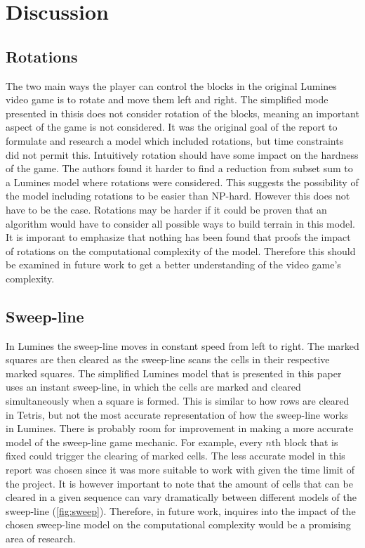 \section{Discussion}
\label{discussion}

\subsection{Rotations}

The two main ways the player can control the blocks in the original Lumines video game is to rotate and move them left and right. The simplified mode presented in thisis does not consider rotation of the blocks, meaning an important aspect of the game is not considered. It was the original goal of the report to formulate and research a model which included rotations, but time constraints did not permit this. Intuitively rotation should have some impact on the hardness of the game. The authors found it harder to find a reduction from subset sum to a Lumines model where rotations were considered. This suggests the possibility of the model including rotations to be easier than NP-hard. However this does not have to be the case. Rotations may be harder if it could be proven that an algorithm would have to consider all possible ways to build terrain in this model. It is imporant to emphasize that nothing has been found that proofs the impact of rotations on the computational complexity of the model. Therefore this should be examined in future work to get a better understanding of the video game's complexity.

\subsection{Sweep-line}

In Lumines the sweep-line moves in constant speed from left to right. The marked squares are then cleared as the sweep-line scans the cells in their respective marked squares. The simplified Lumines model that is presented in this paper uses an instant sweep-line, in which the cells are marked and cleared simultaneously when a square is formed. This is similar to how rows are cleared in Tetris, but not the most accurate representation of how the sweep-line works in Lumines. There is probably room for improvement in making a more accurate model of the sweep-line game mechanic. For example, every $n\text{th}$ block that is fixed could trigger the clearing of marked cells. The less accurate model in this report was chosen since it was more suitable to work with given the time limit of the project. It is however important to note that the amount of cells that can be cleared in a given sequence can vary dramatically between different models of the sweep-line (\autoref{fig:sweep}). Therefore, in future work, inquires into the impact of the chosen sweep-line model on the computational complexity would be a promising area of research.

